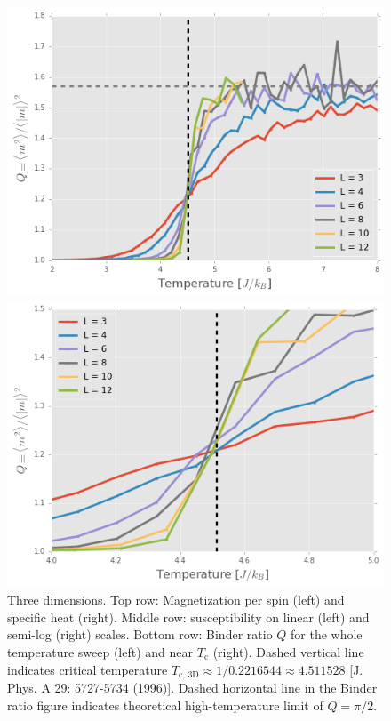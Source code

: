 \documentclass[11pt, oneside]{article}
\begin{document}
\begin{figure}[H]
    \begin{minipage}{0.47\textwidth}
    \includegraphics[width=\linewidth]{img/3D/binderQ}
    \end{minipage}
    \hspace{\fill} %
    \begin{minipage}{0.47\textwidth}
    \includegraphics[width=\linewidth]{img/3D/binderQ_close}
    \end{minipage}
\caption{Three dimensions. Top row: Magnetization per spin (left) and specific heat (right). Middle row: susceptibility on linear (left) and semi-log (right) scales. Bottom row: Binder ratio $Q$ for the whole temperature sweep (left) and near $T_\text{c}$ (right). Dashed vertical line indicates critical temperature $T_{\text{c, 3D}}\approx1/0.2216544\approx4.511528$ [J. Phys. A 29: 5727-5734 (1996)]. Dashed horizontal line in the Binder ratio figure indicates theoretical high-temperature limit of $Q=\pi/2$.}
\label{fig:3D_all}
\end{figure}
\end{document}
